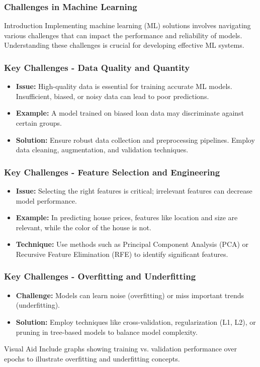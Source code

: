 \documentclass[aspectratio=169]{beamer}
\begin{document}
\begin{frame}[fragile]
    \frametitle{Challenges in Machine Learning}
    \begin{block}{Introduction}
        Implementing machine learning (ML) solutions involves navigating various challenges that can impact the performance and reliability of models. Understanding these challenges is crucial for developing effective ML systems.
    \end{block}
\end{frame}

\begin{frame}[fragile]
    \frametitle{Key Challenges - Data Quality and Quantity}
    \begin{itemize}
        \item \textbf{Issue:} High-quality data is essential for training accurate ML models. Insufficient, biased, or noisy data can lead to poor predictions.
        \item \textbf{Example:} A model trained on biased loan data may discriminate against certain groups.
        \item \textbf{Solution:} Ensure robust data collection and preprocessing pipelines. Employ data cleaning, augmentation, and validation techniques.
    \end{itemize}
\end{frame}

\begin{frame}[fragile]
    \frametitle{Key Challenges - Feature Selection and Engineering}
    \begin{itemize}
        \item \textbf{Issue:} Selecting the right features is critical; irrelevant features can decrease model performance.
        \item \textbf{Example:} In predicting house prices, features like location and size are relevant, while the color of the house is not.
        \item \textbf{Technique:} Use methods such as Principal Component Analysis (PCA) or Recursive Feature Elimination (RFE) to identify significant features.
    \end{itemize}
\end{frame}

\begin{frame}[fragile]
    \frametitle{Key Challenges - Overfitting and Underfitting}
    \begin{itemize}
        \item \textbf{Challenge:} Models can learn noise (overfitting) or miss important trends (underfitting).
        \item \textbf{Solution:} Employ techniques like cross-validation, regularization (L1, L2), or pruning in tree-based models to balance model complexity.
    \end{itemize}
    \begin{block}{Visual Aid}
        Include graphs showing training vs. validation performance over epochs to illustrate overfitting and underfitting concepts.
    \end{block}
\end{frame}
\end{document}

